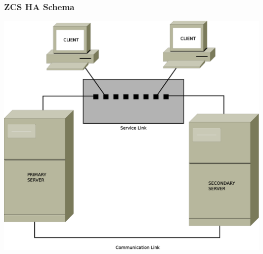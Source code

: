 \documentclass[10pt]{beamer}
\begin{document}
\begin{frame}
\frametitle{ZCS HA Schema}

\begin{center}
  \includegraphics[scale=0.19,keepaspectratio=true]{./img/ha_main_schema.eps}
\end{center}


\end{frame}
\end{document}
